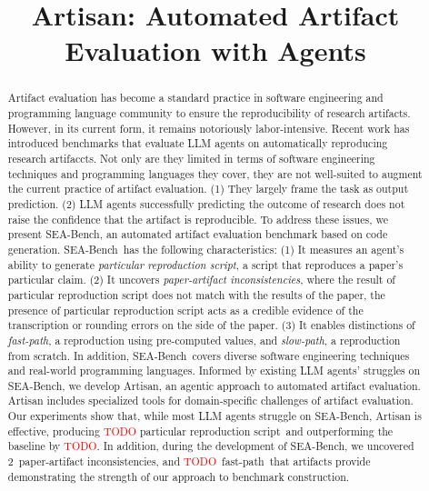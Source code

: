 \documentclass[acmsmall,screen,review,anonymous]{acmart}
\begin{document}
\newcommand\benchmark{SEA-Bench}
\newcommand\approach{Artisan}

\newcommand\particularscrip{particular reproduction script}
\newcommand\newbug{paper-artifact inconsistencies}
\newcommand\fastpath{fast-path}
\newcommand\slowpath{slow-path}

\newcommand\papersetsize{28}
\newcommand\tablesetsize{101}
\newcommand\particularscriptsize{\textcolor{red}{TODO}}
\newcommand\particularscriptsizeoutperform{\textcolor{red}{TODO}}
\newcommand\inconsistenciessize{2}
\newcommand\fastpathsize{\textcolor{red}{TODO}}

\newcommand\todo[1]{\textcolor{red}{TODO: #1}}

\title{Artisan: Automated Artifact Evaluation with Agents}
\begin{abstract}
Artifact evaluation has become a standard practice in software engineering and programming language community to ensure the reproducibility of research artifacts.
However, in its current form, it remains notoriously labor-intensive.
Recent work has introduced benchmarks that evaluate LLM agents on automatically reproducing research artifaccts.
Not only are they limited in terms of software engineering techniques and programming languages they cover, they are not well-suited to augment the current practice of artifact evaluation.
(1) They largely frame the task as output prediction.
(2) LLM agents successfully predicting the outcome of research does not raise the confidence that the artifact is reproducible.
To address these issues, we present \benchmark, an automated artifact evaluation benchmark based on code generation.
\benchmark~has the following characteristics:
(1) It measures an agent’s ability to generate \emph{\particularscrip{}}, a script that reproduces a paper’s particular claim.
(2) It uncovers \emph{\newbug{}}, where the result of \particularscrip{} does not match with the results of the paper, the presence of \particularscrip{} acts as a credible evidence of the transcription or rounding errors on the side of the paper.
(3) It enables distinctions of \emph{\fastpath{}}, a reproduction using pre-computed values, and \emph{\slowpath{}}, a reproduction from scratch.
In addition, \benchmark~covers diverse software engineering techniques and real-world programming languages.
Informed by existing LLM agents’ struggles on \benchmark, we develop Artisan, an agentic approach to automated artifact evaluation.
Artisan includes specialized tools for domain-specific challenges of artifact evaluation.
Our experiments show that, while most LLM agents struggle on \benchmark, Artisan is effective, producing \particularscriptsize{} \particularscrip{}~and outperforming the baseline by \particularscriptsizeoutperform{}.
In addition, during the development of \benchmark, we uncovered \inconsistenciessize~\newbug{}, and \fastpathsize~\fastpath{}~that artifacts provide demonstrating the strength of our approach to benchmark construction.
\end{abstract}
\maketitle










\end{document}
